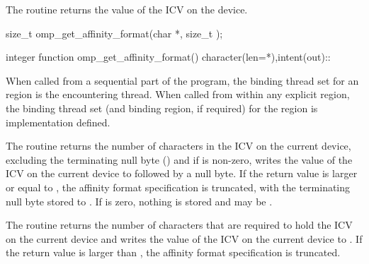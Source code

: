 \summary
The  routine returns the value of the
 ICV on the device.

\format
\begin{ccppspecific}
\begin{ompcFunction}
size_t omp_get_affinity_format(char *, size_t );
\end{ompcFunction}
\end{ccppspecific}

\begin{fortranspecific}
\begin{ompfFunction}
integer function omp_get_affinity_format()
character(len=*),intent(out)::
\end{ompfFunction}
\end{fortranspecific}

\binding
When called from a sequential part of the program, the binding thread 
set for an  region is the encountering 
thread. When called from within any explicit  region, 
the binding thread set (and binding region, if required) for the 
 region is implementation defined.

\effect
\begin{ccppspecific}
The  routine returns the number of characters
in the  ICV on the current device, excluding 
the terminating null byte () and if  is non-zero, 
writes the value of the  ICV on the current 
device to  followed by a null byte.  If the return value 
is larger or equal to , the affinity format specification is 
truncated, with the terminating null byte stored to 
{}.  If  is zero, nothing 
is stored and  may be .
\end{ccppspecific}

\begin{fortranspecific}
The  routine returns the number of characters 
that are required to hold the  ICV on the current 
device and writes the value of the  ICV on the 
current device to . If the return value is larger than 
{}, the affinity format specification is truncated.
\end{fortranspecific}

